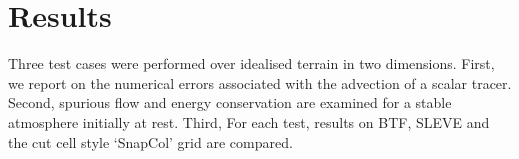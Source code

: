 \chapter{Results}
Three test cases were performed over idealised terrain in two dimensions.  First, we report on the numerical errors associated with the advection of a scalar tracer.  Second, spurious flow and energy conservation are examined for a stable atmosphere initially at rest.  Third,   For each test, results on BTF, SLEVE and the cut cell style `SnapCol' grid are compared.  





